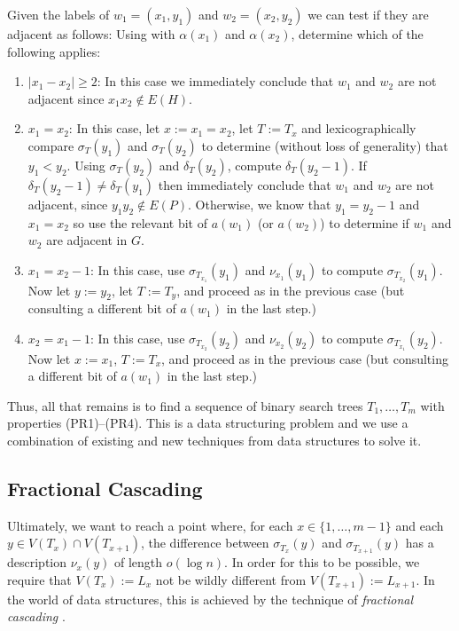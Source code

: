 \documentclass[kpfonts]{patmorin}
\begin{document}
Given the labels of $w_1=(x_1,y_1)$ and $w_2=(x_2,y_2)$ we can test if they are adjacent as follows: Using  with $\alpha(x_1)$ and $\alpha(x_2)$, determine which of the following applies:
\begin{enumerate}
  \item $|x_1-x_2|\ge 2$: In this case we immediately conclude that $w_1$ and $w_2$ are not adjacent since $x_1x_2\not\in E(H)$.  
  
  \item $x_1=x_2$: In this case, let $x:=x_1=x_2$, let $T:=T_x$ and lexicographically compare $\sigma_T(y_1)$ and $\sigma_T(y_2)$ to determine (without loss of generality) that $y_1<y_2$.  Using $\sigma_{T}(y_2)$ and $\delta_{T}(y_2)$, compute $\delta_{T}(y_2-1)$.  If $\delta_{T}(y_2-1)\neq \delta_T(y_1)$ then immediately conclude that $w_1$ and $w_2$ are not adjacent, since $y_1y_2\not\in E(P)$.  Otherwise, we know that $y_1=y_2-1$ and $x_1=x_2$ so use the relevant bit of $a(w_1)$ (or $a(w_2)$) to determine if $w_1$ and $w_2$ are adjacent in $G$.
  
  \item $x_1=x_2-1$: In this case, use $\sigma_{T_{x_1}}(y_1)$ and $\nu_{x_1}(y_1)$ to compute $\sigma_{T_{x_2}}(y_1)$.  Now let $y:=y_2$, let $T:=T_{y}$, and proceed as in the previous case (but consulting a different bit of $a(w_1)$ in the last step.)
  
  \item $x_2=x_1-1$: In this case, use $\sigma_{T_{x_2}}(y_2)$ and $\nu_{x_2}(y_2)$ to compute $\sigma_{T_{x_1}}(y_2)$.  Now let $x:=x_1$, $T:=T_{x}$, and proceed as in the previous case (but consulting a different bit of $a(w_1)$ in the last step.)
\end{enumerate}

Thus, all that remains is to find a sequence of binary search trees $T_1,\ldots,T_m$ with properties (PR1)--(PR4). This is a data structuring problem and we use a combination of existing and new techniques from data structures to solve it.

\subsection{Fractional Cascading}

Ultimately, we want to reach a point where, for each $x\in\{1,\ldots,m-1\}$ and each $y\in V(T_x)\cap V(T_{x+1})$, the difference between $\sigma_{T_x}(y)$ and $\sigma_{T_{x+1}}(y)$ has a description $\nu_x(y)$ of length $o(\log n)$.  In order for this to be possible, we require that $V(T_x):= L_x$ not be wildly different from $V(T_{x+1}):= L_{x+1}$.  In the world of data structures, this is achieved by the technique of \emph{fractional cascading} \cite{chazelle.guibas:fractional1, chazelle.guibas:fractional2}.
\end{document}
